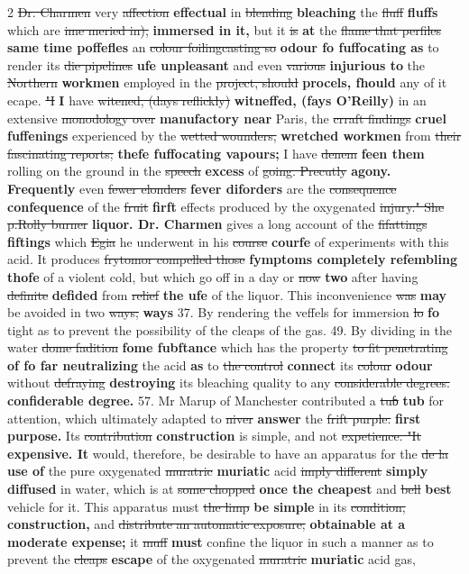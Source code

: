 \documentclass[10pt]{article}
\begin{document}
\begin{multicols}{2}
\sout{Dr. Charmen} very \sout{affection} \textbf{effectual} in \sout{blending} \textbf{bleaching} the \sout{fluff} \textbf{fluffs} which are \sout{ime meried in),} \textbf{immersed in it,} but it \sout{is} \textbf{at} the \sout{flame that perfiles} \textbf{same time poffefles} an \sout{colour foilingcasting so} \textbf{odour fo fuffocating as} to render its \sout{die pipelines} \textbf{ufe unpleasant} and even \sout{various} \textbf{injurious to} the \sout{Northern} \textbf{workmen} employed in the \sout{project, should} \textbf{procels, fhould} any of it ecape. \sout{"I} \textbf{I} have \sout{witened, (days reflickly)} \textbf{witneffed, (fays O'Reilly)} in an extensive \sout{monodology over} \textbf{manufactory near} Paris, the \sout{crraft findings} \textbf{cruel fuffenings} experienced by the \sout{wetted wounders,} \textbf{wretched workmen} from \sout{their fascinating reports;} \textbf{thefe fuffocating vapours;} I have \sout{denem} \textbf{feen them} rolling on the ground in the \sout{speech} \textbf{excess} of \sout{going. Precutly} \textbf{agony. Frequently} even \sout{fewer elonders} \textbf{fever diforders} are the \sout{consequence} \textbf{confequence} of the \sout{fruit} \textbf{firft} effects produced by the oxygenated \sout{injury." She p.Rolly burner} \textbf{liquor. Dr. Charmen} gives a long account of the \sout{fifattings} \textbf{fiftings} which \sout{Egia} he underwent in his \sout{course} \textbf{courfe} of experiments with this acid. It produces \sout{frytomor compelled those} \textbf{fymptoms completely refembling thofe} of a violent cold, but which go off in a day or \sout{now} \textbf{two} after having \sout{definite} \textbf{defided} from \sout{relief} \textbf{the ufe} of the liquor. This inconvenience \sout{was} \textbf{may} be avoided in two \sout{ways;} \textbf{ways} 37. By rendering the veffels for immersion \sout{lo} \textbf{fo} tight as to prevent the possibility of the cleaps of the gas. 49. By dividing in the water \sout{dome fadition} \textbf{fome fubftance} which has the property \sout{to fit penetrating} \textbf{of fo far neutralizing} the acid \textbf{as} to \sout{the control} \textbf{connect} its \sout{colour} \textbf{odour} without \sout{defraying} \textbf{destroying} its bleaching quality to any \sout{considerable degrees.} \textbf{confiderable degree.} 57. Mr Marup of Manchester contributed a \sout{tuɓ} \textbf{tub} for attention, which ultimately adapted to \sout{niver} \textbf{answer} the \sout{frift purple.} \textbf{first purpose.} Its \sout{contribution} \textbf{construction} is simple, and not \sout{expetience. "It} \textbf{expensive. It} would, therefore, be desirable to have an apparatus for the \sout{de la} \textbf{use of} the pure oxygenated \sout{muratric} \textbf{muriatic} acid \sout{imply different} \textbf{simply diffused} in water, which is at \sout{some chopped} \textbf{once the cheapest} and \sout{bell} \textbf{best} vehicle for it. This apparatus must \sout{the limp} \textbf{be simple} in its \sout{condition,} \textbf{construction,} and \sout{distribute an automatic exposure;} \textbf{obtainable at a moderate expense;} it \sout{muff} \textbf{must} confine the liquor in such a manner as to prevent the \sout{cleaps} \textbf{escape} of the oxygenated \sout{muratric} \textbf{muriatic} acid gas, 
\end{multicols}
\end{document}
